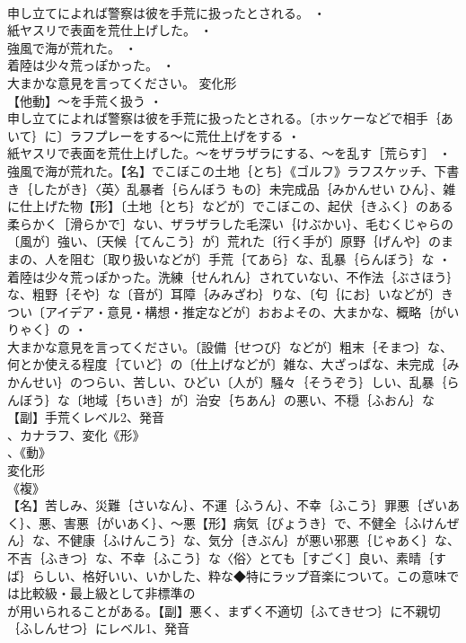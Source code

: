 \documentclass[8pt]{extreport}
\begin{document}
\begin{CJK}{UTF8}{min}
\\	申し立てによれば警察は彼を手荒に扱ったとされる。 ・
\\	紙ヤスリで表面を荒仕上げした。 ・
\\	強風で海が荒れた。 ・
\\	着陸は少々荒っぽかった。 ・
\\	大まかな意見を言ってください。	変化形 
\\	【他動】～を手荒く扱う ・
\\	申し立てによれば警察は彼を手荒に扱ったとされる。〔ホッケーなどで相手｛あいて｝に〕ラフプレーをする～に荒仕上げをする ・
\\	紙ヤスリで表面を荒仕上げした。～をザラザラにする、～を乱す［荒らす］ ・
\\	強風で海が荒れた。【名】でこぼこの土地｛とち｝《ゴルフ》ラフスケッチ、下書き｛したがき｝〈英〉乱暴者｛らんぼう もの｝未完成品｛みかんせい ひん｝、雑に仕上げた物【形】〔土地｛とち｝などが〕でこぼこの、起伏｛きふく｝のある柔らかく［滑らかで］ない、ザラザラした毛深い｛けぶかい｝、毛むくじゃらの〔風が〕強い、〔天候｛てんこう｝が〕荒れた〔行く手が〕原野｛げんや｝のままの、人を阻む〔取り扱いなどが〕手荒｛てあら｝な、乱暴｛らんぼう｝な ・
\\	着陸は少々荒っぽかった。洗練｛せんれん｝されていない、不作法｛ぶさほう｝な、粗野｛そや｝な〔音が〕耳障｛みみざわ｝りな、〔匂｛にお｝いなどが〕きつい〔アイデア・意見・構想・推定などが〕おおよその、大まかな、概略｛がいりゃく｝の ・
\\	大まかな意見を言ってください。〔設備｛せつび｝などが〕粗末｛そまつ｝な、何とか使える程度｛ていど｝の〔仕上げなどが〕雑な、大ざっぱな、未完成｛みかんせい｝のつらい、苦しい、ひどい〔人が〕騒々｛そうぞう｝しい、乱暴｛らんぼう｝な〔地域｛ちいき｝が〕治安｛ちあん｝の悪い、不穏｛ふおん｝な【副】手荒くレベル2、発音
\\	、カナラフ、変化《形》
\\	、《動》
\\	変化形 
\\	《複》
\\	【名】苦しみ、災難｛さいなん｝、不運｛ふうん｝、不幸｛ふこう｝罪悪｛ざいあく｝、悪、害悪｛がいあく｝、～悪【形】病気｛びょうき｝で、不健全｛ふけんぜん｝な、不健康｛ふけんこう｝な、気分｛きぶん｝が悪い邪悪｛じゃあく｝な、不吉｛ふきつ｝な、不幸｛ふこう｝な〈俗〉とても［すごく］良い、素晴｛すば｝らしい、格好いい、いかした、粋な◆特にラップ音楽について。この意味では比較級・最上級として非標準の
\\	が用いられることがある。【副】悪く、まずく不適切｛ふてきせつ｝に不親切｛ふしんせつ｝にレベル1、発音

\end{CJK}
\end{document}

